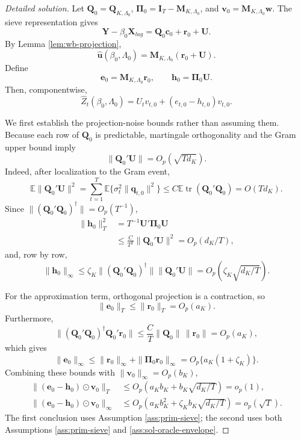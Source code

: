 \documentclass[12pt]{article}
\numberwithin{equation}{section}
\theoremstyle{definition}
\newcommand{\E}{\mathbb E}
\begin{document}
\begin{proof}[Detailed solution]
Let \(\bm Q_0=\bm Q_{K,\Lambda_0}\),
\(\bm\Pi_0=\bm I_T-\bm M_{K,\Lambda_0}\), and
\(\bm v_0=\bm M_{K,\Lambda_0}\bm w\).  The sieve representation gives
\[
    \bm Y-\beta_0\bm X_{lag}
    =\bm Q_0\bm c_0+\bm r_0+\bm U.
\]
By Lemma \ref{lem:wb-projection},
\[
    \widehat{\bm u}(\beta_0,\Lambda_0)
    =\bm M_{K,\Lambda_0}(\bm r_0+\bm U).
\]
Define
\[
    \bm e_0=\bm M_{K,\Lambda_0}\bm r_0,
    \qquad
    \bm h_0=\bm\Pi_0\bm U.
\]
Then, componentwise,
\begin{equation}
    \widehat Z_t(\beta_0,\Lambda_0)
    =U_tv_{t,0}+(e_{t,0}-h_{t,0})v_{t,0}.
    \label{eq:sol-feasible-score-decomp}
\end{equation}

We first establish the projection-noise bounds rather than assuming them.
Because each row of \(\bm Q_0\) is predictable, martingale orthogonality and
the Gram upper bound imply
\[
    \|\bm Q_0'\bm U\|=O_p(\sqrt{Td_K}).
\]
Indeed, after localization to the Gram event,
\[
    \E\|\bm Q_0'\bm U\|^2
    =\sum_{t=1}^T\E\{\sigma_t^2\|\bm q_{t,0}\|^2\}
    \leq C\E\operatorname{tr}(\bm Q_0'\bm Q_0)
    =O(Td_K).
\]
Since \(\|(\bm Q_0'\bm Q_0)^\dagger\|=O_p(T^{-1})\),
\begin{align*}
    \|\bm h_0\|_T^2
    &=T^{-1}\bm U'\bm\Pi_0\bm U\\
    &\leq
      \frac{C}{T^2}\|\bm Q_0'\bm U\|^2
      =O_p(d_K/T),
\end{align*}
and, row by row,
\[
    \|\bm h_0\|_\infty
    \leq
    \zeta_K\|(\bm Q_0'\bm Q_0)^\dagger\|
             \|\bm Q_0'\bm U\|
    =O_p\left(\zeta_K\sqrt{d_K/T}\right).
\]

For the approximation term, orthogonal projection is a contraction, so
\[
    \|\bm e_0\|_T\leq\|\bm r_0\|_T=O_p(a_K).
\]
Furthermore,
\[
    \|(\bm Q_0'\bm Q_0)^\dagger\bm Q_0'\bm r_0\|
    \leq \frac{C}{T}\|\bm Q_0\|\,\|\bm r_0\|
    =O_p(a_K),
\]
which gives
\[
    \|\bm e_0\|_\infty
    \leq \|\bm r_0\|_\infty+\|\bm\Pi_0\bm r_0\|_\infty
    =O_p\{a_K(1+\zeta_K)\}.
\]
Combining these bounds with
\(\|\bm v_0\|_\infty=O_p(b_K)\),
\begin{align*}
    \|(\bm e_0-\bm h_0)\odot\bm v_0\|_T
    &\leq O_p\left(a_Kb_K+b_K\sqrt{d_K/T}\right)=o_p(1),\\
    \|(\bm e_0-\bm h_0)\odot\bm v_0\|_\infty
    &\leq O_p\left(a_Kb_K^2+\zeta_Kb_K\sqrt{d_K/T}\right)
      =o_p(\sqrt T).
\end{align*}
The first conclusion uses Assumption \ref{ass:prim-sieve}; the second uses
both Assumptions \ref{ass:prim-sieve} and
\ref{ass:sol-oracle-envelope}.


\end{proof}
\end{document}
